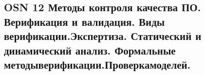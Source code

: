 \subsection{OSN 12 Методы контроля качества ПО. Верификация и валидация. Виды
верификации.Экспертиза. Статический и динамический анализ. Формальные
методыверификации.Проверкамоделей.}
